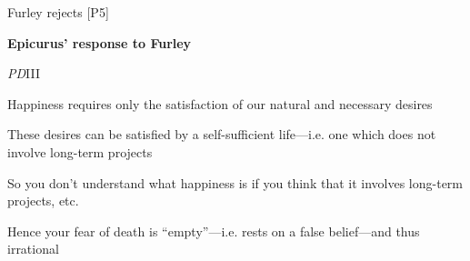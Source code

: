\documentclass[11pt]{article}
\begin{document}
\noindent Furley rejects [P5]
\vspace*{5mm}

\noindent \textbf{Epicurus' response to Furley}
\vspace*{2mm}

\noindent \emph{PD}III
\vspace*{1mm}

\noindent [1] Happiness requires only the satisfaction of our natural and necessary desires
\vspace*{1mm}

\noindent [2] These desires can be satisfied by a self-sufficient life---i.e. one which does not involve long-term projects
\vspace*{1mm}

\noindent [3] So you don't understand what happiness is if you think that it involves long-term projects, etc.
\vspace*{1mm}

\noindent [4] Hence your fear of death is ``empty''---i.e. rests on a false belief---and thus irrational
\end{document}
